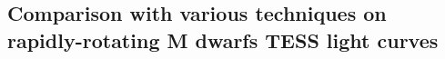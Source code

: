 \documentclass[modern]{aastex631}
\begin{document}
\newpage
\subsection{Comparison with various techniques on rapidly-rotating M dwarfs TESS light curves}\label{real}


\end{document}
